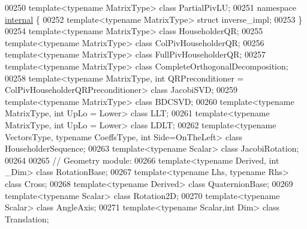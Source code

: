 \begin{DoxyCode}
00250 \textcolor{keyword}{template}<\textcolor{keyword}{typename} MatrixType> \textcolor{keyword}{class }PartialPivLU;
00251 \textcolor{keyword}{namespace }\hyperlink{namespaceinternal}{internal} \{
00252 \textcolor{keyword}{template}<\textcolor{keyword}{typename} MatrixType> \textcolor{keyword}{struct }inverse\_impl;
00253 \}
00254 \textcolor{keyword}{template}<\textcolor{keyword}{typename} MatrixType> \textcolor{keyword}{class }HouseholderQR;
00255 \textcolor{keyword}{template}<\textcolor{keyword}{typename} MatrixType> \textcolor{keyword}{class }ColPivHouseholderQR;
00256 \textcolor{keyword}{template}<\textcolor{keyword}{typename} MatrixType> \textcolor{keyword}{class }FullPivHouseholderQR;
00257 \textcolor{keyword}{template}<\textcolor{keyword}{typename} MatrixType> \textcolor{keyword}{class }CompleteOrthogonalDecomposition;
00258 \textcolor{keyword}{template}<\textcolor{keyword}{typename} MatrixType, \textcolor{keywordtype}{int} QRPreconditioner = ColPivHouseholderQRPreconditioner> \textcolor{keyword}{class }JacobiSVD;
00259 \textcolor{keyword}{template}<\textcolor{keyword}{typename} MatrixType> \textcolor{keyword}{class }BDCSVD;
00260 \textcolor{keyword}{template}<\textcolor{keyword}{typename} MatrixType, \textcolor{keywordtype}{int} UpLo = Lower> \textcolor{keyword}{class }LLT;
00261 \textcolor{keyword}{template}<\textcolor{keyword}{typename} MatrixType, \textcolor{keywordtype}{int} UpLo = Lower> \textcolor{keyword}{class }LDLT;
00262 \textcolor{keyword}{template}<\textcolor{keyword}{typename} VectorsType, \textcolor{keyword}{typename} CoeffsType, \textcolor{keywordtype}{int} S\textcolor{keywordtype}{id}e=OnTheLeft> \textcolor{keyword}{class }HouseholderSequence;
00263 \textcolor{keyword}{template}<\textcolor{keyword}{typename} Scalar>     \textcolor{keyword}{class }JacobiRotation;
00264 
00265 \textcolor{comment}{// Geometry module:}
00266 \textcolor{keyword}{template}<\textcolor{keyword}{typename} Derived, \textcolor{keywordtype}{int} \_Dim> \textcolor{keyword}{class }RotationBase;
00267 \textcolor{keyword}{template}<\textcolor{keyword}{typename} Lhs, \textcolor{keyword}{typename} Rhs> \textcolor{keyword}{class }Cross;
00268 \textcolor{keyword}{template}<\textcolor{keyword}{typename} Derived> \textcolor{keyword}{class }QuaternionBase;
00269 \textcolor{keyword}{template}<\textcolor{keyword}{typename} Scalar> \textcolor{keyword}{class }Rotation2D;
00270 \textcolor{keyword}{template}<\textcolor{keyword}{typename} Scalar> \textcolor{keyword}{class }AngleAxis;
00271 \textcolor{keyword}{template}<\textcolor{keyword}{typename} Scalar,\textcolor{keywordtype}{int} Dim> \textcolor{keyword}{class }Translation;

\end{DoxyCode}
